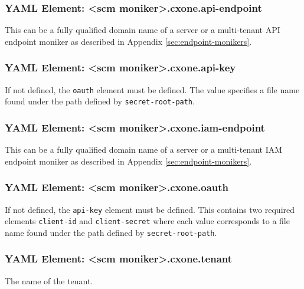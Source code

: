 \subsubsection{YAML Element: <scm moniker>.cxone.api-endpoint}\label{sec:yaml-cxone-api-endpoint}
This can be a fully qualified domain name of a server or a multi-tenant API endpoint moniker as described in Appendix \ref{sec:endpoint-monikers}.

\subsubsection{YAML Element: <scm moniker>.cxone.api-key}\label{sec:yaml-cxone-api-key}
If not defined, the \texttt{oauth} element must be defined. The value specifies a file name found under the path defined by \texttt{secret-root-path}.

\subsubsection{YAML Element: <scm moniker>.cxone.iam-endpoint}\label{sec:yaml-cxone-iam-endpoint}
This can be a fully qualified domain name of a server or a multi-tenant IAM endpoint moniker as described in Appendix \ref{sec:endpoint-monikers}.

\subsubsection{YAML Element: <scm moniker>.cxone.oauth}\label{sec:yaml-cxone-oauth}
If not defined, the \texttt{api-key} element must be defined. This contains two required elements
\texttt{client-id} and \texttt{client-secret} where each value corresponds to a file name found under the path defined by \texttt{secret-root-path}. 

\subsubsection{YAML Element: <scm moniker>.cxone.tenant}\label{sec:yaml-cxone-tenant}
The name of the \cxone tenant.

